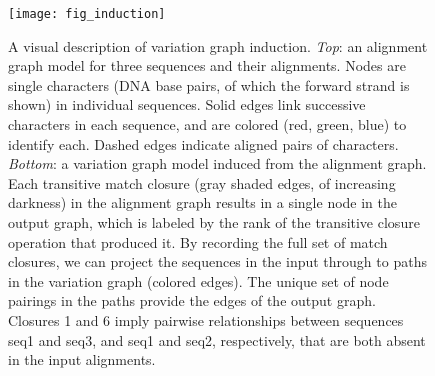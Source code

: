 \begin{figure}
   \texttt{[image: fig\_induction]}
   \caption{
   A visual description of variation graph induction.
   \textit{Top}: an alignment graph model for three sequences and their alignments.
   Nodes are single characters (DNA base pairs, of which the forward strand is shown) in individual sequences.
   Solid edges link successive characters in each sequence, and are colored (red, green, blue) to identify each.
   Dashed edges indicate aligned pairs of characters.
    \textit{Bottom}: a variation graph model induced from the alignment graph.
   Each transitive match closure (gray shaded edges, of increasing darkness) in the alignment graph results in a single node in the output graph, which is labeled by the rank of the transitive closure operation that produced it.
   By recording the full set of match closures, we can project the sequences in the input through to paths in the variation graph (colored edges).
   The unique set of node pairings in the paths provide the edges of the output graph.
   Closures 1 and 6 imply pairwise relationships between sequences seq1 and seq3, and seq1 and seq2, respectively, that are both absent in the input alignments.
    }
    \label{fig:induction}
\end{figure}
